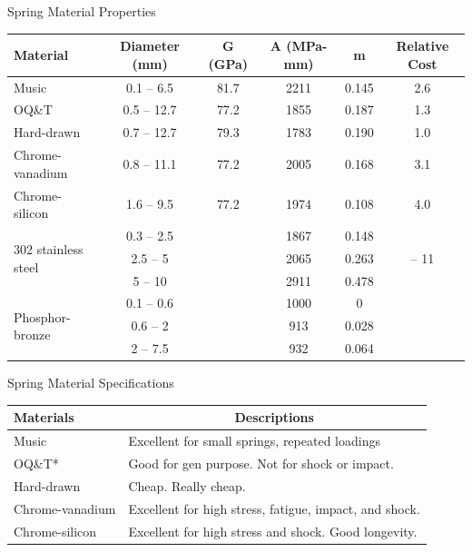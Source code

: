 \documentclass[10pt, svgnames]{beamer}
\begin{document}
\begin{frame}[label={sec:orgda47365}]{Spring Material Properties}
\footnotesize
\begin{tabular}{ l c c c c c }
  \toprule
  Material & Diameter (mm) & G (GPa) & A (MPa-mm) & m & Relative Cost \\
  \midrule
  Music & 0.1 – 6.5 & 81.7 & 2211 & 0.145 & 2.6 \\
  \midrule
  OQ\&T & 0.5 – 12.7 & 77.2 & 1855 & 0.187 & 1.3 \\
  \midrule
  Hard-drawn & 0.7 – 12.7 & 79.3 & 1783 & 0.190 & 1.0 \\
  \midrule
  Chrome-vanadium & 0.8 – 11.1 & 77.2 & 2005 & 0.168 & 3.1 \\
  \midrule
  Chrome-silicon & 1.6 – 9.5 & 77.2 & 1974 & 0.108 & 4.0 \\
  \midrule
  \multirow{3}{2.2cm}{302 stainless steel} & 0.3 – 2.5 & \multirow{3}{1cm}{\centering 69} & 1867 & 0.148 & \multirow{3}{2cm}{\centering 7.6 – 11} \\
           & 2.5 – 5 & & 2065 & 0.263 & \\
           & 5 – 10 & & 2911 & 0.478 & \\
  \midrule
  \multirow{3}{2.2cm}{Phosphor-bronze} & 0.1 – 0.6 & \multirow{3}{1cm}{\centering 41} & 1000 & 0 & \multirow{3}{2cm}{\centering 8.0} \\
           & 0.6 – 2 & & 913 & 0.028 & \\
           & 2 – 7.5 & & 932 & 0.064 & \\
  \bottomrule
\end{tabular}
\end{frame}

\begin{frame}[label={sec:orgfad4fcc}]{Spring Material Specifications}
\small
\begin{tabular}{ l p{8cm}}
  \toprule
  Materials & \multicolumn{1}{c}{Descriptions}  \\
  \midrule
  Music & Excellent for small springs, repeated loadings \\
  \midrule
  OQ\&T* & Good for gen purpose. Not for shock or impact. \\
  \midrule
  Hard-drawn & Cheap. Really cheap. \\
  \midrule
  Chrome-vanadium & Excellent for high stress, fatigue, impact, and shock. \\
  \midrule
  Chrome-silicon & Excellent for high stress and shock. Good longevity. \\
  \bottomrule
\end{tabular}
\end{frame}
\end{document}
